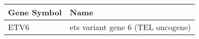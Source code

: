 \begin{tabular}{ll}
\toprule
Gene Symbol &                              Name \\
\midrule
       ETV6 & ets variant gene 6 (TEL oncogene) \\
\bottomrule
\end{tabular}

